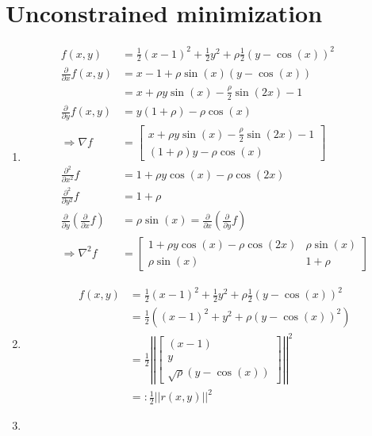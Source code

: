 \documentclass[oneside, a4paper]{book}
\newcommand\abss[1]{\left|\left|#1\right|\right|}
\newcommand\br[1]{\left(#1\right)}
\begin{document}
\chapter{Unconstrained minimization}
\begin{enumerate}
  \item \begin{align*}
    f(x,y) &= \frac{1}{2}(x-1)^2 + \frac{1}{2}y^2+\rho\frac{1}{2}(y-\cos(x))^2\\
    \frac{\partial}{\partial x} f(x,y) &= x - 1 + \rho\sin(x)(y-\cos(x))\\
    &= x + \rho y\sin(x)-\frac{\rho}{2}\sin(2x) - 1 \\
    \frac{\partial}{\partial y} f(x,y) &= y (1 + \rho) -\rho \cos(x)\\
    \Longrightarrow \nabla f &= \begin{bmatrix}
      x + \rho y\sin(x)-\frac{\rho}{2}\sin(2x) - 1\\
      (1 + \rho)y  -\rho \cos(x)
    \end{bmatrix}\\
    \frac{\partial^2}{\partial x^2}f &= 1 + \rho y \cos(x) -\rho\cos(2x)\\
    \frac{\partial^2}{\partial y^2}f &= 1 + \rho\\
    \frac{\partial}{\partial y}\br{\frac{\partial}{\partial x}f} &=  \rho\sin(x) =  \frac{\partial}{\partial x}\br{\frac{\partial}{\partial y}f}\\
    \Longrightarrow \nabla^2 f &= \begin{bmatrix}
      1 + \rho y \cos(x) -\rho\cos(2x) & \rho\sin(x) \\
      \rho\sin(x) &  1 + \rho
    \end{bmatrix}
  \end{align*}
  \item \begin{align*}
    f(x,y) &= \frac{1}{2}(x-1)^2 + \frac{1}{2}y^2+\rho\frac{1}{2}(y-\cos(x))^2\\
    &= \frac{1}{2}\br{(x-1)^2 + y^2 + \rho(y-\cos(x))^2}\\
    &=  \frac{1}{2} \abss{\begin{bmatrix}
      (x-1)\\
      y\\
      \sqrt{\rho}\br{y-\cos(x)}
    \end{bmatrix}}^2\\
    &=: \frac{1}{2}\abss{r(x,y)}^2
  \end{align*}
  \item \begin{align*}

\end{align*}
\end{enumerate}
\end{document}
